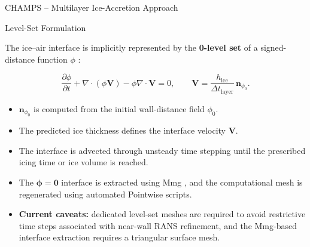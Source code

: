 \begin{frame}[c]{\small CHAMPS -- Multilayer Ice-Accretion Approach}
\scriptsize

\vspace{-0.10cm}

\centering

\begin{minipage}[t]{0.47\textwidth}

\begin{block}{\scriptsize Level-Set Formulation}

The ice--air interface is implicitly represented by the
\textbf{0-level set} of a signed-distance function $\phi$
\cite{OSHER2004,FROLKOVIC2015214,lavoieLevelSet, alessandroLevelSet}:

\[
\frac{\partial \phi}{\partial t}
+ \nabla \cdot (\phi \boldsymbol{V})
- \phi \nabla \cdot \boldsymbol{V}
= 0,
\qquad
\boldsymbol{V}
=
\frac{h_{\mathrm{ice}}}{\Delta t_{\mathrm{layer}}}
\,\boldsymbol{n}_{\phi_0}.
\]

\begin{itemize}
    \setlength{\itemsep}{0.2cm}

    \item $\boldsymbol{n}_{\phi_0}$ is computed from the initial wall-distance field $\phi_0$.

    \item The predicted ice thickness defines the interface velocity $\boldsymbol{V}$.

    \item The interface is advected through unsteady time stepping until the prescribed icing time or ice volume is reached.

    \item The $\boldsymbol{\phi=0}$ interface is extracted using Mmg \cite{dapogny2014mmg}, and the computational mesh is regenerated using automated Pointwise scripts.

    \item \textbf{Current caveats:} dedicated level-set meshes are required to avoid restrictive time steps associated with near-wall RANS refinement, and the Mmg-based interface extraction requires a triangular surface mesh.
\end{itemize}

\end{block}

\end{minipage}%
\hspace{0.03\textwidth}%
\begin{minipage}[t]{0.50\textwidth}
\vspace{0pt}
\centering


\end{minipage}
\end{frame}
